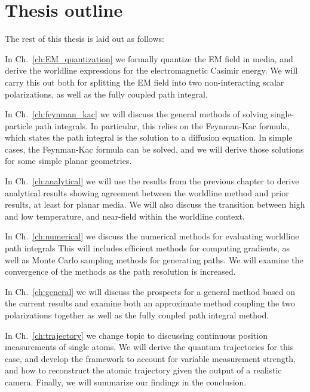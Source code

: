 \section{Thesis outline}

The rest of this thesis is laid out as follows: 

In Ch.~\ref{ch:EM_quantization} we formally quantize
the EM field in media, and derive the worldline expressions for the electromagnetic Casimir energy.
We will carry this out both for splitting the EM field into two non-interacting scalar polarizations,
as well as the fully coupled path integral.

In Ch.~\ref{ch:feynman_kac} we will discuss the general methods of solving single-particle path 
integrals.  In particular, this relies on the Feynman-Kac formula, which states the path integral
 is the solution to a diffusion equation.  In simple cases, the Feynman-Kac formula can be solved,
and we will derive those solutions for some simple planar geometries. 

In Ch.~\ref{ch:analytical} we will use the results from the previous chapter to derive analytical 
results showing agreement between the worldline method and prior results, at least for planar media.
We will also discuss the transition between high and low temperature, and near-field within the
worldline context.  

In Ch.~\ref{ch:numerical} we discuss the numerical methods for evaluating worldline path integrals
This will includes efficient methods for computing gradients, as well as Monte Carlo sampling methods
for generating paths.  We will examine the convergence of the methods as the path resolution is increased.

In Ch.~\ref{ch:general} we will discuss the prospects for a general method based on the current
results and examine both an approximate method coupling the two polarizations together as well
as the fully coupled path integral method.  %

In Ch.~\ref{ch:trajectory} we change topic to discussing continuous position measurements 
of single atoms.  We will derive the quantum trajectories for this case, and develop the framework
to account for variable measurement strength, and how to reconstruct the atomic trajectory
given the output of a realistic camera.  
Finally, we will summarize our findings in the conclusion.  




